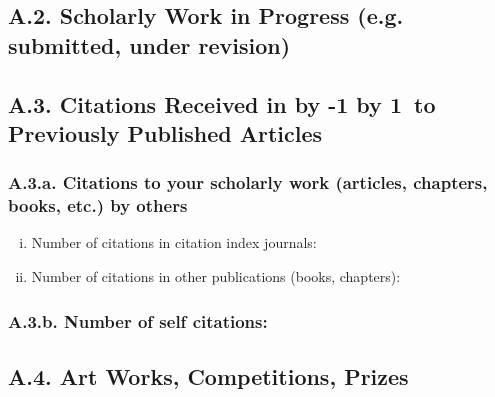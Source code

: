 \documentclass[12pt]{article}
\newcommand\LastYear{%
  \advance\year by -1 \the\year\advance\year by 1}
\begin{document}
\subsection*{A.2. Scholarly Work in Progress (e.g. submitted, under revision)}

\subsection*{A.3. Citations Received in \LastYear ~to Previously Published Articles}

\subsubsection*{A.3.a. Citations to your scholarly work (articles, chapters, books, etc.) by others}

\begin{enumerate}[i)]

\item  Number of citations in citation index journals:	
\item Number of citations in other publications (books, chapters):	

\end{enumerate}

\subsubsection*{A.3.b. Number of self citations:}

\subsection*{A.4. Art Works, Competitions, Prizes}
\end{document}
